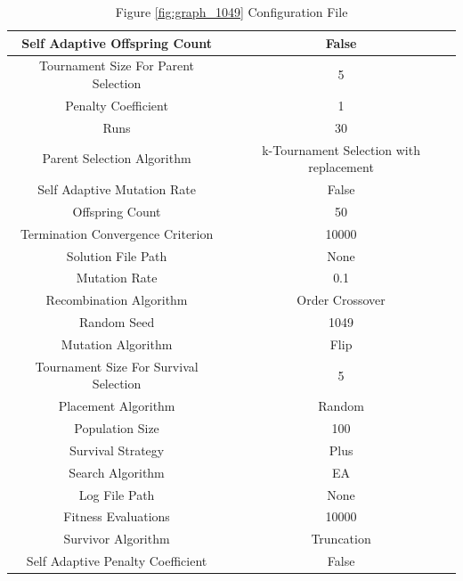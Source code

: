 \documentclass{standalone}
\begin{document}
\begin{table}[!htb]
	\centering
	\caption{Figure \ref{fig:graph_1049} Configuration File}
	\label{tab:graph_1049}
	\begin{tabular}{| c | c |}
		\hline
		Self Adaptive Offspring Count		& False		 \\
		\hline
		Tournament Size For Parent Selection		& 5		 \\
		\hline
		Penalty Coefficient		& 1		 \\
		\hline
		Runs		& 30		 \\
		\hline
		Parent Selection Algorithm		& k-Tournament Selection with replacement		 \\
		\hline
		Self Adaptive Mutation Rate		& False		 \\
		\hline
		Offspring Count		& 50		 \\
		\hline
		Termination Convergence Criterion		& 10000		 \\
		\hline
		Solution File Path		& None		 \\
		\hline
		Mutation Rate		& 0.1		 \\
		\hline
		Recombination Algorithm		& Order Crossover		 \\
		\hline
		Random Seed		& 1049		 \\
		\hline
		Mutation Algorithm		& Flip		 \\
		\hline
		Tournament Size For Survival Selection		& 5		 \\
		\hline
		Placement Algorithm		& Random		 \\
		\hline
		Population Size		& 100		 \\
		\hline
		Survival Strategy		& Plus		 \\
		\hline
		Search Algorithm		& EA		 \\
		\hline
		Log File Path		& None		 \\
		\hline
		Fitness Evaluations		& 10000		 \\
		\hline
		Survivor Algorithm		& Truncation		 \\
		\hline
		Self Adaptive Penalty Coefficient		& False		 \\
		\hline
	\end{tabular}
\end{table}
\end{document}

